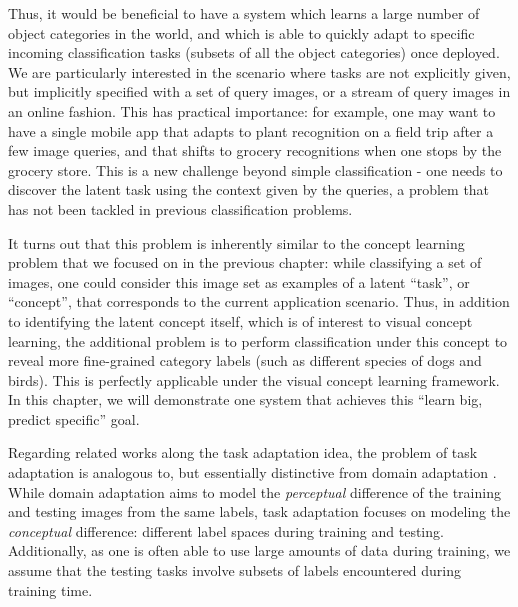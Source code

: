 Thus, it would be beneficial to have a system which learns a large number of object categories in the world, and which is able to quickly adapt to specific incoming classification tasks (subsets of all the object categories) once deployed. We are particularly interested in the scenario where tasks are not explicitly given, but implicitly specified with a set of query images, or a stream of query images in an online fashion. This has practical importance: for example, one may want to have a single mobile app that adapts to plant recognition on a field trip after a few image queries, and that shifts to grocery recognitions when one stops by the grocery store. This is a new challenge beyond simple classification - one needs to discover the latent task using the context given by the queries, a problem that has not been tackled in previous classification problems.

It turns out that this problem is inherently similar to the concept learning problem that we focused on in the previous chapter: while classifying a set of images, one could consider this image set as examples of a latent ``task'', or ``concept'', that corresponds to the current application scenario. Thus, in addition to identifying the latent concept itself, which is of interest to visual concept learning, the additional problem is to perform classification under this concept to reveal more fine-grained category labels (such as different species of dogs and birds). This is perfectly applicable under the visual concept learning framework. In this chapter, we will demonstrate one system that achieves this ``learn big, predict specific'' goal.

Regarding related works along the task adaptation idea, the problem of task adaptation is analogous to, but essentially distinctive from domain adaptation \cite{saenko2010adapting,kulis2011you}. While domain adaptation aims to model the \emph{perceptual} difference of the training and testing images from the same labels, task adaptation focuses on modeling the \emph{conceptual} difference: different label spaces during training and testing. Additionally, as one is often able to use large amounts of data during training, we assume that the testing tasks involve subsets of labels encountered during training time.


